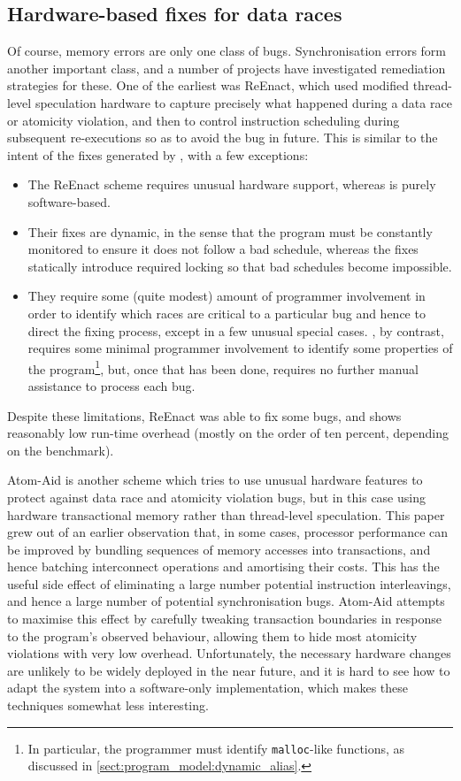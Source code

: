 \subsection{Hardware-based fixes for data races}
Of course, memory errors are only one class of bugs.  Synchronisation
errors form another important class, and a number of projects have
investigated remediation strategies for these.  One of the earliest
was ReEnact\cite{Prvulovic2003a}, which used modified thread-level
speculation hardware to capture precisely what happened during a data
race or atomicity violation, and then to control instruction
scheduling during subsequent re-executions so as to avoid the bug in
future.  This is similar to the intent of the fixes generated by
{\technique}, with a few exceptions:
\begin{itemize}
\item The ReEnact scheme requires unusual hardware support, whereas
  {\technique} is purely software-based.
\item Their fixes are dynamic, in the sense that the program must be
  constantly monitored to ensure it does not follow a bad schedule,
  whereas the {\technique} fixes statically introduce required locking
  so that bad schedules become impossible.
\item They require some (quite modest) amount of programmer
  involvement in order to identify which races are critical to a
  particular bug and hence to direct the fixing process, except in a
  few unusual special cases.  {\Technique}, by contrast, requires some
  minimal programmer involvement to identify some properties of the
  program\footnote{In particular, the programmer must identify
    \texttt{malloc}-like functions, as discussed in
    \autoref{sect:program_model:dynamic_alias}.}, but, once that has
  been done, requires no further manual assistance to process each
  bug.
\end{itemize}
Despite these limitations, ReEnact was able to fix some bugs, and
shows reasonably low run-time overhead (mostly on the order of ten
percent, depending on the benchmark).

Atom-Aid\cite{Lucia2009} is another scheme which tries to use unusual
hardware features to protect against data race and atomicity violation
bugs, but in this case using hardware transactional
memory\cite{Herlihy1993} rather than thread-level speculation.  This
paper grew out of an earlier observation that, in some cases,
processor performance can be improved by bundling sequences of memory
accesses into transactions, and hence batching interconnect operations
and amortising their costs\cite{Ceze2007}.  This has the useful side
effect of eliminating a large number potential instruction
interleavings, and hence a large number of potential synchronisation
bugs.  Atom-Aid attempts to maximise this effect by carefully tweaking
transaction boundaries in response to the program's observed
behaviour, allowing them to hide most atomicity violations with very
low overhead.  Unfortunately, the necessary hardware changes are
unlikely to be widely deployed in the near future, and it is hard to
see how to adapt the system into a software-only implementation, which
makes these techniques somewhat less interesting.

